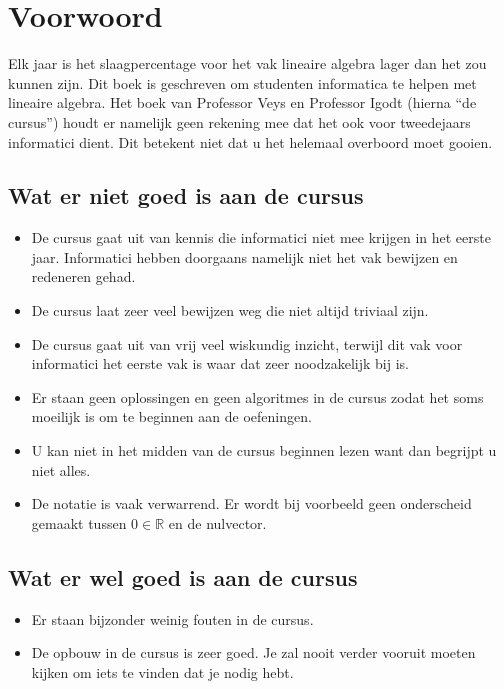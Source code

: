 \documentclass[lineaire_algebra_oplossingen.tex]{subfiles}
\begin{document}
\newpage
\section*{Voorwoord}
Elk jaar is het slaagpercentage voor het vak lineaire algebra lager dan het zou kunnen zijn. Dit boek is geschreven om studenten informatica te helpen met lineaire algebra. Het boek van Professor Veys en Professor Igodt (hierna ``de cursus'') houdt er namelijk geen rekening mee dat het ook voor tweedejaars informatici dient. Dit betekent niet dat u het helemaal overboord moet gooien.

\subsection*{Wat er niet goed is aan de cursus}
\begin{itemize}
\item De cursus gaat uit van kennis die informatici niet mee krijgen in het eerste jaar. Informatici hebben doorgaans namelijk niet het vak bewijzen en redeneren gehad.
\item De cursus laat zeer veel bewijzen weg die niet altijd triviaal zijn.
\item De cursus gaat uit van vrij veel wiskundig inzicht, terwijl dit vak voor informatici het eerste vak is waar dat zeer noodzakelijk bij is.
\item Er staan geen oplossingen en geen algoritmes in de cursus zodat het soms moeilijk is om te beginnen aan de oefeningen.
\item U kan niet in het midden van de cursus beginnen lezen want dan begrijpt u niet alles.
\item De notatie is vaak verwarrend. Er wordt bij voorbeeld geen onderscheid gemaakt tussen $0\in \mathbb{R}$ en de nulvector.
\end{itemize}

\subsection*{Wat er wel goed is aan de cursus}
\begin{itemize}
\item Er staan bijzonder weinig fouten in de cursus.
\item De opbouw in de cursus is zeer goed. Je zal nooit verder vooruit moeten kijken om iets te vinden dat je nodig hebt.
\end{itemize}
\end{document}
